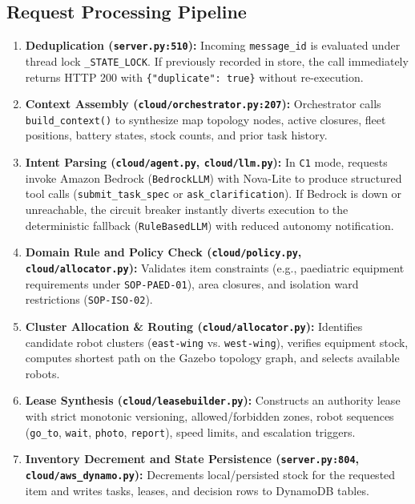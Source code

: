 \documentclass[10pt,letterpaper]{article}
\begin{document}
\subsection{Request Processing Pipeline}
\begin{enumerate}
  \item \textbf{Deduplication (\texttt{server.py:510}):} Incoming \texttt{message\_id} is evaluated under thread lock \texttt{\_STATE\_LOCK}. If previously recorded in store, the call immediately returns HTTP 200 with \texttt{\{"duplicate": true\}} without re-execution.
  \item \textbf{Context Assembly (\texttt{cloud/orchestrator.py:207}):} Orchestrator calls \texttt{build\_context()} to synthesize map topology nodes, active closures, fleet positions, battery states, stock counts, and prior task history.
  \item \textbf{Intent Parsing (\texttt{cloud/agent.py}, \texttt{cloud/llm.py}):} In \texttt{C1} mode, requests invoke Amazon Bedrock (\texttt{BedrockLLM}) with Nova-Lite to produce structured tool calls (\texttt{submit\_task\_spec} or \texttt{ask\_clarification}). If Bedrock is down or unreachable, the circuit breaker instantly diverts execution to the deterministic fallback (\texttt{RuleBasedLLM}) with reduced autonomy notification.
  \item \textbf{Domain Rule and Policy Check (\texttt{cloud/policy.py}, \texttt{cloud/allocator.py}):} Validates item constraints (e.g., paediatric equipment requirements under \texttt{SOP-PAED-01}), area closures, and isolation ward restrictions (\texttt{SOP-ISO-02}).
  \item \textbf{Cluster Allocation \& Routing (\texttt{cloud/allocator.py}):} Identifies candidate robot clusters (\texttt{east-wing} vs. \texttt{west-wing}), verifies equipment stock, computes shortest path on the Gazebo topology graph, and selects available robots.
  \item \textbf{Lease Synthesis (\texttt{cloud/leasebuilder.py}):} Constructs an authority lease with strict monotonic versioning, allowed/forbidden zones, robot sequences (\texttt{go\_to}, \texttt{wait}, \texttt{photo}, \texttt{report}), speed limits, and escalation triggers.
  \item \textbf{Inventory Decrement and State Persistence (\texttt{server.py:804}, \texttt{cloud/aws\_dynamo.py}):} Decrements local/persisted stock for the requested item and writes tasks, leases, and decision rows to DynamoDB tables.
\end{enumerate}
\end{document}
